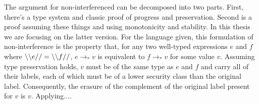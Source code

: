 \documentclass[12pt]{report}
\begin{document}
The argument for non-interferenced can be decomposed into two parts.
First, there's a type system and classic proof of progress and
preservation. Second is a proof assuming these things and using
monotonicity and stability.  In this thesis we are focusing on the
latter version.  For the language given, this formulation of
non-interference is the property that, for any two well-typed
expressions $e$ and $f$ where $\backslash\backslash {e} // = \backslash\backslash {f} //$, $e \to_* v$ is
equivalent to $f \to_* v$ for some value $v$. Assuming type
preservation holds, $v$ must be of the same type as $e$ and $f$ and
carry all of their labels, each of which must be of a lower security
class than the original label.  Consequently, the erasure of the
complement of the original label present for $v$ is $v$. Applying....




{}


\end{document}
